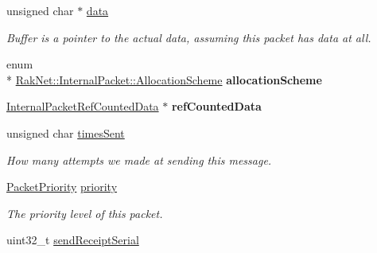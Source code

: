 \begin{DoxyCompactItemize}
\item 
\hypertarget{struct_rak_net_1_1_internal_packet_ace7f4e85f5f74f6ae114c623372bc71c}{unsigned char $\ast$ \hyperlink{struct_rak_net_1_1_internal_packet_ace7f4e85f5f74f6ae114c623372bc71c}{data}}\label{struct_rak_net_1_1_internal_packet_ace7f4e85f5f74f6ae114c623372bc71c}

\begin{DoxyCompactList}\small\item\em Buffer is a pointer to the actual data, assuming this packet has data at all. \end{DoxyCompactList}\item 
\hypertarget{struct_rak_net_1_1_internal_packet_af6434be2af8d4a68b910b0422f6bd84d}{enum \\*
\hyperlink{struct_rak_net_1_1_internal_packet_a902a05c67f6c8f288e33a9fb0015e196}{Rak\-Net\-::\-Internal\-Packet\-::\-Allocation\-Scheme} {\bfseries allocation\-Scheme}}\label{struct_rak_net_1_1_internal_packet_af6434be2af8d4a68b910b0422f6bd84d}

\item 
\hypertarget{struct_rak_net_1_1_internal_packet_a500d7b5b313838ef05ade713fc460730}{\hyperlink{struct_rak_net_1_1_internal_packet_ref_counted_data}{Internal\-Packet\-Ref\-Counted\-Data} $\ast$ {\bfseries ref\-Counted\-Data}}\label{struct_rak_net_1_1_internal_packet_a500d7b5b313838ef05ade713fc460730}

\item 
\hypertarget{struct_rak_net_1_1_internal_packet_a7ad0eb42981938237a6ddd53a26d6781}{unsigned char \hyperlink{struct_rak_net_1_1_internal_packet_a7ad0eb42981938237a6ddd53a26d6781}{times\-Sent}}\label{struct_rak_net_1_1_internal_packet_a7ad0eb42981938237a6ddd53a26d6781}

\begin{DoxyCompactList}\small\item\em How many attempts we made at sending this message. \end{DoxyCompactList}\item 
\hypertarget{struct_rak_net_1_1_internal_packet_a89745e1f79162057a6d149ac5351f1db}{\hyperlink{_packet_priority_8h_a659378374e516180f93640c79f59705c}{Packet\-Priority} \hyperlink{struct_rak_net_1_1_internal_packet_a89745e1f79162057a6d149ac5351f1db}{priority}}\label{struct_rak_net_1_1_internal_packet_a89745e1f79162057a6d149ac5351f1db}

\begin{DoxyCompactList}\small\item\em The priority level of this packet. \end{DoxyCompactList}\item 
\hypertarget{struct_rak_net_1_1_internal_packet_a11dbf03bde3dc15592863f4cdba854ef}{uint32\-\_\-t \hyperlink{struct_rak_net_1_1_internal_packet_a11dbf03bde3dc15592863f4cdba854ef}{send\-Receipt\-Serial}}\label{struct_rak_net_1_1_internal_packet_a11dbf03bde3dc15592863f4cdba854ef}


\end{DoxyCompactItemize}
